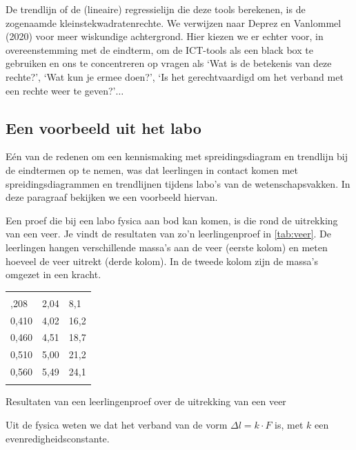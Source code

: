 \begin{multicols}{2}

De trendlijn of de (lineaire) regressielijn die deze tools berekenen, is de zogenaamde kleinstekwadratenrechte. We verwijzen naar Deprez en Vanlommel (2020) voor meer wiskundige achtergrond. Hier kiezen we er echter voor, in overeenstemming met de eindterm, om de ICT-tools als een black box te gebruiken en ons te concentreren op vragen als `Wat is de betekenis van deze rechte?', `Wat kun je ermee doen?', `Is het gerechtvaardigd om het verband met een rechte weer te geven?’$\ldots$

     \subsection{Een voorbeeld uit het labo} \label{subsection:voorbeeld labo}

Eén van de redenen om een kennismaking met spreidingsdiagram en trendlijn bij de eindtermen op te nemen, was dat leerlingen in contact komen met spreidingsdiagrammen en trendlijnen tijdens labo’s van de wetenschapsvakken. In deze paragraaf bekijken we een voorbeeld hiervan.

Een proef die bij een labo fysica aan bod kan komen, is die rond de uitrekking van een veer. Je vindt de resultaten van zo’n leerlingenproef in \autoref{tab:veer}. De leerlingen hangen verschillende massa’s aan de veer (eerste kolom) en meten hoeveel de veer uitrekt (derde kolom). In de tweede kolom zijn de massa’s omgezet in een kracht.

	\begin{tabel}
		\begin{tabular}{C{1.8cm} C{1.8cm} C{2.3cm}}
			\hlinethick
			 &  &  \\
			,208 & 2,04 & 8,1 \\
			0,410 & 4,02 & 16,2 \\
			0,460 & 4,51 & 18,7 \\
			0,510 & 5,00 & 21,2 \\
			0,560 & 5,49 & 24,1 \\
			\hlinethick
		\end{tabular}
		\caption{Resultaten van een leerlingenproef over de uitrekking van een veer}\label{tab:veer}
	\end{tabel}

Uit de fysica weten we dat het verband van de vorm $\Delta l=k \cdot F$ is, met $k$ een evenredigheidsconstante.


\end{multicols}
